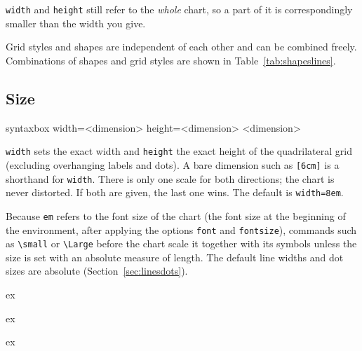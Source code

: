 \documentclass[a4paper,11pt]{article}
\newcommand\cmd[1]{\texttt{\textbackslash #1}}
\newcommand\opt[1]{\texttt{#1}}
\begin{document}
\noindent
\opt{width} and \opt{height} still refer to the \emph{whole} chart, so a part of it is correspondingly smaller than the width you give.

Grid styles and shapes are independent of each other and can be combined freely. Combinations of shapes and grid styles are shown in Table~\ref{tab:shapeslines}.




\subsection{Size}
\label{sec:Size}

\begin{tcblisting}{syntaxbox}
width=<dimension>     height=<dimension>     <dimension>
\end{tcblisting}

\noindent
\opt{width} sets the exact width and \opt{height} the exact height of the quadrilateral grid (excluding overhanging labels and dots). A bare dimension such as \texttt{[6cm]} is a shorthand for \opt{width}. There is only
one scale for both directions; the chart is never distorted. If both are given,
the last one wins. The default is \texttt{width=8em}.

Because \texttt{em} refers to the font size of the chart (the font size at the beginning of the
environment, after applying the options \opt{font} and \opt{fontsize}), commands such as \cmd{small} or \cmd{Large} before the chart
scale it together with its symbols unless the size is set with an absolute measure of length. The default line widths and dot sizes are absolute (Section~\ref{sec:linesdots}).

\begin{tcblisting}{ex}
\begin{vowelchart}[height=2cm]
\end{vowelchart}
\end{tcblisting}

\begin{tcblisting}{ex}
\begin{vowelchart}[width=1.5cm]
\end{vowelchart}
\end{tcblisting}

\begin{tcblisting}{ex}
{\Large
  \begin{vowelchart}
  \end{vowelchart}
}
\end{tcblisting}
\end{document}
